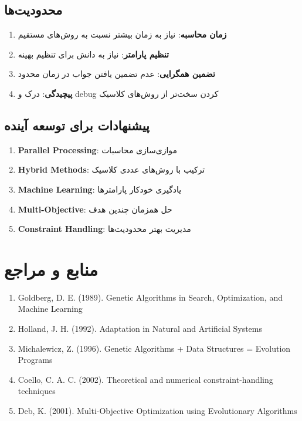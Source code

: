 \documentclass[12pt,a4paper]{article}
\begin{document}
			\subsection{محدودیت‌ها}
			
			\begin{enumerate}
				\item \textbf{زمان محاسبه}: نیاز به زمان بیشتر نسبت به روش‌های مستقیم
				\item \textbf{تنظیم پارامتر}: نیاز به دانش برای تنظیم بهینه
				\item \textbf{تضمین همگرایی}: عدم تضمین یافتن جواب در زمان محدود
				\item \textbf{پیچیدگی}: درک و debug کردن سخت‌تر از روش‌های کلاسیک
			\end{enumerate}
			
			\subsection{پیشنهادات برای توسعه آینده}
			
			\begin{enumerate}
				\item \textbf{Parallel Processing}: موازی‌سازی محاسبات
				\item \textbf{Hybrid Methods}: ترکیب با روش‌های عددی کلاسیک
				\item \textbf{Machine Learning}: یادگیری خودکار پارامترها
				\item \textbf{Multi-Objective}: حل همزمان چندین هدف
				\item \textbf{Constraint Handling}: مدیریت بهتر محدودیت‌ها
			\end{enumerate}
			
			\section{منابع و مراجع}
			
			\begin{enumerate}
				\item Goldberg, D. E. (1989). Genetic Algorithms in Search, Optimization, and Machine Learning
				\item Holland, J. H. (1992). Adaptation in Natural and Artificial Systems
				\item Michalewicz, Z. (1996). Genetic Algorithms + Data Structures = Evolution Programs
				\item Coello, C. A. C. (2002). Theoretical and numerical constraint-handling techniques
				\item Deb, K. (2001). Multi-Objective Optimization using Evolutionary Algorithms
			\end{enumerate}
			
\end{document}
